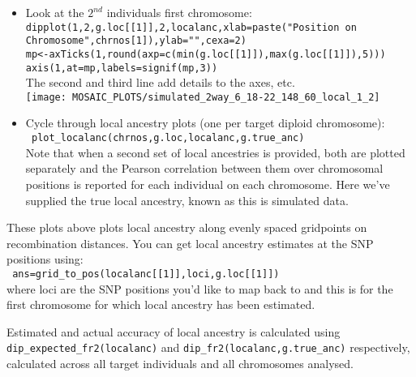 \documentclass{article}
\begin{document}
\begin{itemize}
\item Look at the $2^{nd}$ individuals first chromosome:\\
  \verb-dipplot(1,2,g.loc[[1]],2,localanc,xlab=paste("Position on Chromosome",chrnos[1]),ylab="",cexa=2)-\\
    \verb+mp<-axTicks(1,round(axp=c(min(g.loc[[1]]),max(g.loc[[1]]),5)))+\\
    \verb+axis(1,at=mp,labels=signif(mp,3))+\\
    The second and third line add details to the axes, etc. \\
    \texttt{[image: MOSAIC\_PLOTS/simulated\_2way\_6\_18-22\_148\_60\_local\_1\_2]}\\

\item Cycle through local ancestry plots (one per target diploid chromosome):\\
\verb+ plot_localanc(chrnos,g.loc,localanc,g.true_anc)+ \\
Note that when a second set of local ancestries is provided, both are plotted separately and the Pearson correlation
between them over chromosomal positions is reported for each individual on each chromosome. Here we've supplied the true local ancestry, known as this is simulated data. 
\end{itemize}

These plots above plots local ancestry along evenly spaced gridpoints on recombination distances. You can get 
local ancestry estimates at the SNP positions using:\\
\verb+ ans=grid_to_pos(localanc[[1]],loci,g.loc[[1]])+\\
where loci are the SNP positions you'd like to map back to and this is for the first chromosome for which local ancestry has been estimated.

Estimated and actual accuracy of local ancestry is calculated using \verb+dip_expected_fr2(localanc)+ and 
\verb+dip_fr2(localanc,g.true_anc)+ respectively, calculated across all target individuals and all chromosomes analysed. 
\end{document}
